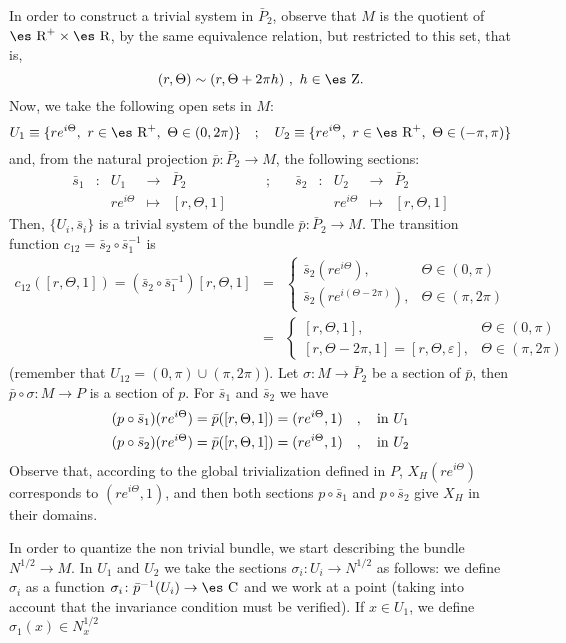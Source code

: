 \documentclass[12pt]{article}
\theoremstyle{plain}
\def\beann{\begin{eqnarray*}}
\def\eeann{\end{eqnarray*}}
\def\Zahl{\mbox{\es Z}}
\def\Real{\mbox{\es R}}
\def\Complex{\mbox{\es C}}
\begin{document}
In order to construct a trivial system in $\bar P_2$,
observe that $M$ is the quotient of $\Real^+ \times \Real$,
by the same equivalence relation,
but restricted to this set, that is,
$$
(r,\Theta ) \sim (r,\Theta +2\pi h) \ , \ h \in \Zahl.
$$
Now, we take the following open sets in $M$:
$$
U_1 \equiv \{re^{i\Theta}, \ r \in \Real^+, \ \Theta \in (0,2\pi ) \}
\quad ; \quad
U_2 \equiv \{re^{i\Theta}, \ r \in \Real^+, \ \Theta \in (-\pi,\pi ) \}
$$
and, from the natural projection
$\bar p \colon \bar P_2 \to M$, the following sections:
$$
\begin{array}{ccccccccccc}
\bar s_1 & \colon & U_1 & \to & \bar P_2
& \qquad ; \quad &
\bar s_2 & \colon & U_2 & \to & \bar P_2
\\
& & re^{i\Theta} & \mapsto & [r, \Theta ,1]
& \qquad &
& & re^{i\Theta} & \mapsto & [r, \Theta ,1]
\end{array}
$$
Then, $\{U_i,\bar s_i \}$ is a trivial system of the bundle
$\bar p \colon \bar P_2 \to M$. The transition function
$c_{12} = \bar s_2 \circ \bar s_1^{-1}$ is
\beann
c_{12}([r,\Theta ,1]) =
(\bar s_2 \circ \bar s_1^{-1})[r,\Theta ,1] &=&
\left\{ \begin{array}{cc}
\bar s_2(re^{i\Theta}), & \mbox{$\Theta \in (0,\pi )$}
\\
\bar s_2(re^{i(\Theta -2\pi )}), & \mbox{$\Theta \in (\pi ,2\pi )$}
\end{array}
\right.
\\ &=&
\left\{ \begin{array}{cc}
[r,\Theta ,1], & \mbox{$\Theta \in (0,\pi )$}
\\
{}[r,\Theta -2\pi ,1]=[r,\Theta ,\varepsilon ],
& \mbox{$\Theta \in (\pi ,2\pi )$}
\end{array}
\right.
\eeann
(remember that $U_{12}=(0,\pi )\cup (\pi ,2\pi)$).
Let $\sigma \colon M \to \bar P_2$ be a section of $\bar p$,
then $\bar p \circ \sigma \colon M \to P$ is a section of $p$.
For $\bar s_1$ and $\bar s_2$ we have
\beann
(p \circ \bar s_1)(re^{i\Theta}) =\bar p([r,\Theta ,1])
=(re^{i\Theta},1)
\quad ,\quad {\rm in}\ U_1
\\
(p \circ \bar s_2)(re^{i\Theta}) = \bar p([r,\Theta ,1])
=(re^{i\Theta},1)
\quad ,\quad {\rm in}\ U_2
\eeann
Observe that, according to the global trivialization defined in $P$,
$X_H(re^{i\Theta})$ corresponds to $(re^{i\Theta},1)$,
and then both sections $p \circ \bar s_1$ and $p \circ \bar s_2$
give $X_H$ in their domains.

In order to quantize the non trivial bundle, we start describing the
bundle
$N^{1/2} \to M$. In $U_1$ and $U_2$ we take the sections
$\sigma_i \colon U_i \to N^{1/2}$ as follows:
we define $\sigma_i$ as a function
 $\sigma_i \colon \bar p^{-1}(U_i) \to\Complex$
and we work at a point (taking into account that the invariance
condition
must be verified). If $x \in U_1$, we define $\sigma_1(x) \in N_x^{1/2}$
\end{document}

